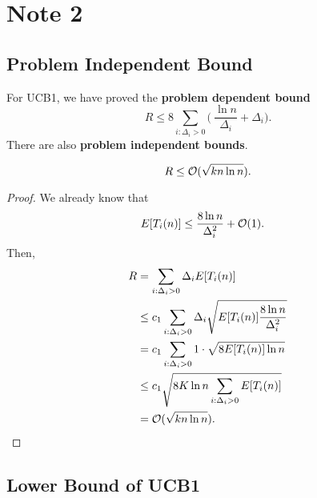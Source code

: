 \newpage
\section{Note 2}

\subsection{Problem Independent Bound} %

For UCB1, we have proved the \textbf{problem dependent bound}
\begin{equation}
    R\le 8 \sum_{i:\Delta_i>0} \bigg(~\frac{\ln n}{\Delta_i}+\Delta_i\bigg).
\end{equation}
There are also \textbf{problem independent bounds}.

\begin{thm}
    \begin{equation}
        R\le\mathcal{O}(\sqrt{kn\ln n}).
    \end{equation}
\end{thm}
\begin{proof}
    We already know that
    \begin{align}
        E[T_i(n)]
            &\le \frac{8\ln n}{\Delta_i^2} + \mathcal{O}(1).
    \end{align}
    Then,
    \begin{align}
        R
            &= \sum_{i:\Delta_i>0} \Delta_i E[T_i(n)] \\
            &\le c_1 \sum_{i:\Delta_i>0} \Delta_i \sqrt{E[T_i(n)] \frac{8\ln n}{\Delta_i^2}} \\
            &= c_1 \sum_{i:\Delta_i>0} 1\cdot \sqrt{8 E[T_i(n)] \ln n} \\
            &\le c_1 \sqrt{8 K \ln n \sum_{i:\Delta_i>0} E[T_i(n)] } \\
            &= \mathcal{O}(\sqrt{kn\ln n}).
    \end{align}

\end{proof}

\subsection{Lower Bound of UCB1} %
